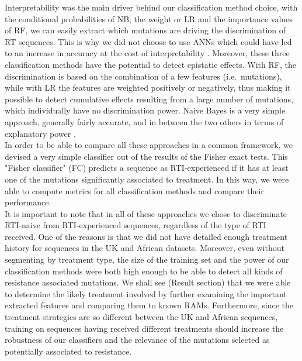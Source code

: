 \documentclass[
  11,
]{scrbook}
\begin{document}
Interpretability was the main driver behind our classification method
choice, with the conditional probabilities of NB, the weight or LR and
the importance values of RF, we can easily extract which mutations are
driving the discrimination of RT sequences. This is why we did not
choose to use ANNs which could have led to an increase in accuracy at
the cost of interpretability
\autocite{alvarezmelisRobustInterpretabilitySelfExplaining2018,hastieElementsStatisticalLearning2009,zhangInterpretableConvolutionalNeural2018}.
Moreover, these three classification methods have the potential to
detect epistatic effects. With RF, the discrimination is based on the
combination of a few features (i.e.~mutations), while with LR the
features are weighted positively or negatively, thus making it possible
to detect cumulative effects resulting from a large number of mutations,
which individually have no discrimination power. Naive Bayes is a very
simple approach, generally fairly accurate, and in between the two
others in terms of explanatory power
\autocite{gascuelTwelveNumericalSymbolic1998}.\\
In order to be able to compare all these approaches in a common
framework, we devised a very simple classifier out of the results of the
Fisher exact tests. This "Fisher classifier" (FC) predicts a sequence
as RTI-experienced if it has at least one of the mutations significantly
associated to treatment. In this way, we were able to compute metrics
for all classification methods and compare their performance.\\
It is important to note that in all of these approaches we chose to
discriminate RTI-naive from RTI-experienced sequences, regardless of the
type of RTI received. One of the reasons is that we did not have
detailed enough treatment history for sequences in the UK and African
datasets. Moreover, even without segmenting by treatment type, the size
of the training set and the power of our classification methods were
both high enough to be able to detect all kinds of resistance associated
mutations. We shall see (Result section) that we were able to determine
the likely treatment involved by further examining the important
extracted features and comparing them to known RAMs. Furthermore, since
the treatment strategies are so different between the UK and African
sequences, training on sequences having received different treatments
should increase the robustness of our classifiers and the relevance of
the mutations selected as potentially associated to resistance.\\
\end{document}

